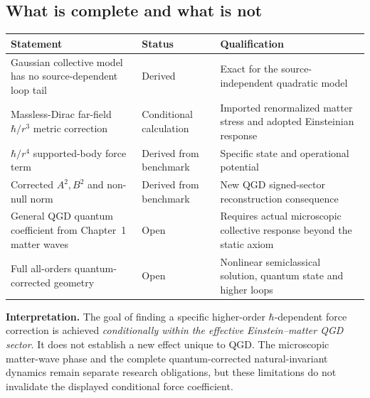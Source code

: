 \documentclass[11pt,a4paper]{article}
\theoremstyle{remark}\newtheorem{remark}[theorem]{Remark}
\begin{document}
\subsection{What is complete and what is not}
\begin{center}\small\begin{tabularx}{\linewidth}{@{}p{36mm}p{24mm}X@{}}\toprule
Statement & Status & Qualification\\\midrule
Gaussian collective model has no source-dependent loop tail & Derived & Exact for the source-independent quadratic model\\
Massless-Dirac far-field $\hbar/r^3$ metric correction & Conditional calculation & Imported renormalized matter stress and adopted Einsteinian response\\
$\hbar/r^4$ supported-body force term & Derived from benchmark & Specific state and operational potential\\
Corrected $A^2,B^2$ and non-null norm & Derived from benchmark & New QGD signed-sector reconstruction consequence\\
General QGD quantum coefficient from Chapter~1 matter waves & Open & Requires actual microscopic collective response beyond the static axiom\\
Full all-orders quantum-corrected geometry & Open & Nonlinear semiclassical solution, quantum state and higher loops\\\bottomrule\end{tabularx}\end{center}
\textbf{Interpretation.} The goal of finding a specific higher-order $\hbar$-dependent
force correction is achieved \emph{conditionally within the effective
Einstein--matter QGD sector}. It does not establish a new effect
unique to QGD. The microscopic matter-wave phase and the complete
quantum-corrected natural-invariant dynamics remain separate research
obligations, but these limitations do not invalidate the displayed
conditional force coefficient.
\end{document}
